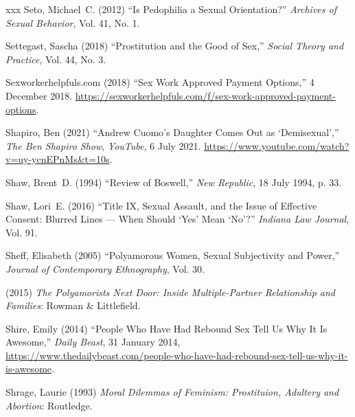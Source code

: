 \documentclass[]{jlreq} \usepackage{mystyle}
\begin{document}
\begin{thebibliography}{xxx}
Seto, Michael~C. (2012) ``Is Pedophilia a Sexual Orientation?'' \textit{
  Archives of Sexual Behavior}, Vol. 41, No. 1.

Settegast, Sascha (2018) ``Prostitution and the Good of Sex,'' \textit{ Social
  Theory and Practice}, Vol. 44, No. 3.

Sexworkerhelpfuls.com (2018) ``Sex Work Approved Payment Options,'' 4 December
  2018.
  \url{https://sexworkerhelpfuls.com/f/sex-work-approved-payment-options}.

Shapiro, Ben (2021) ``Andrew Cuomo's Daughter Comes Out as `Demisexual',''
  \emph{The Ben Shapiro Show}, \emph{YouTube}, 6 July 2021.
  \url{https://www.youtube.com/watch?v=uy-ycnEPnMs&t=10s}.

Shaw, Brent~D. (1994) ``Review of Boswell,'' \emph{New Republic}, 18 July 1994,
  p. 33.

Shaw, Lori~E. (2016) ``Title IX, Sexual Assault, and the Issue of Effective
  Consent: Blurred Lines --- When Should `Yes' Mean `No'?'' \textit{ Indiana
  Law Journal}, Vol. 91.

Sheff, Elisabeth (2005) ``Polyamorous Women, Sexual Subjectivity and Power,''
  \textit{ Journal of Contemporary Ethnography}, Vol. 30.

 \bysame{}  (2015)  \textit{ The Polyamorists Next Door: Inside
  Multiple-Partner Relationship and Families}: Rowman \& Littlefield.

Shire, Emily (2014) ``People Who Have Had Rebound Sex Tell Us Why It Is
  Awesome,'' \emph{Daily Beast}, 31 January 2014,
  \url{https://www.thedailybeast.com/people-who-have-had-rebound-sex-tell-us-why-it-is-awesome}.

Shrage, Laurie (1993)  \textit{ Moral Dilemmas of Feminism: Prostituion,
  Adultery and Abortion}: Routledge.


\end{thebibliography}
\end{document}
